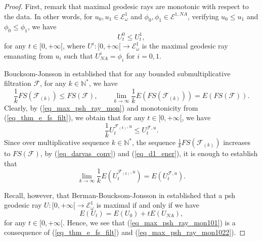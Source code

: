 \documentclass[12pt]{article}
\numberwithin{equation}{section}
\theoremstyle{theorem}
\theoremstyle{definition}
\theoremstyle{remark}
\newcommand{\nat}{\mathbb{N}}
\begin{document}
	\begin{proof}
		First, remark that maximal geodesic rays are monotonic with respect to the data. 
 	In other words, for $u_0, u_1 \in \mathcal{E}_{\omega}^1$ and $\phi_0, \phi_1 \in \mathcal{E}^{1, NA}$, verifying $u_0 \leq u_1$ and $\phi_0 \leq \phi_1$, we have
	 	\begin{equation}\label{eq_max_psh_ray_mon}
	 		U^0_t \leq U^1_t,
	 	\end{equation}
	 	for any $t \in [0, + \infty[$, where $U^i : [0, + \infty[ \to \mathcal{E}_{\omega}^1$ is the maximal geodesic ray emanating from $u_i$ such that $U^i_{NA} = \phi_i$ for $i = 0, 1$.
	 	\par  
 		Boucksom-Jonsson in \cite[Theorem 5.4 and Lemma 6.17iii) and \S 3.6]{BouckJohn21} established that for any bounded submultiplicative filtration $\mathcal{F}$, for any $k \in \nat^*$, we have
		\begin{equation}\label{eq_thm_e_fs_filt}
			\frac{1}{k}
			FS(\mathcal{F}_{(k)}) \leq FS(\mathcal{F}),
			\qquad
			\lim_{k \to \infty} \frac{1}{k} E( FS(\mathcal{F}_{(k)})) = E(FS(\mathcal{F})).
		\end{equation}
		Clearly, by (\ref{eq_max_psh_ray_mon}) and monotonicity from (\ref{eq_thm_e_fs_filt}), we obtain that for any $t \in [0, +\infty[$, we have
		\begin{equation}
			\frac{1}{k} U^{\mathcal{F}_{(k)}, u}_{t} 
			\leq 
			U^{\mathcal{F}, u}_t.
		\end{equation}
		Since over multiplicative sequence $k \in \nat^*$, the sequence $\frac{1}{k} FS(\mathcal{F}_{(k)})$ increases to $FS(\mathcal{F})$, by (\ref{eq_darvas_conv}) and (\ref{eq_d1_ener}), it is enough to establish that 
		\begin{equation}\label{eq_max_psh_ray_mon101}
			\lim_{k \to \infty} \frac{1}{k} E(U^{\mathcal{F}_{(k)}, u}_{t} ) = E(U^{\mathcal{F}, u}_t).
		\end{equation}
		\par Recall, however, that Berman-Boucksom-Jonsson in \cite[Corollary 6.7]{BerBouckJonYTD} established that a psh geodesic ray $U : [0, + \infty[ \to \mathcal{E}_{\omega}^1$ is maximal if and only if we have 
		\begin{equation}\label{eq_max_psh_ray_mon1022}
			E(U_t) = E(U_0) + t E(U_{NA}),
		\end{equation}
		for any $t \in [0, +\infty[$.
		Hence, we see that (\ref{eq_max_psh_ray_mon101}) is a consequence of (\ref{eq_thm_e_fs_filt}) and (\ref{eq_max_psh_ray_mon1022}).
	\end{proof}
\end{document}
